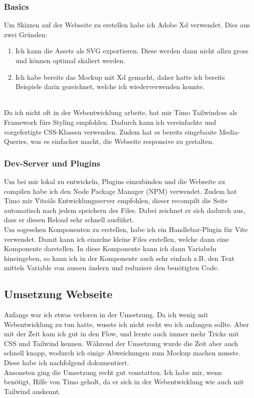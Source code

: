 \documentclass[11pt]{article}
\begin{document}
    \subsubsection{Basics}
    Um Skizzen auf der Webseite zu erstellen habe ich Adobe Xd verwendet. Dies aus zwei Gründen:
    \begin{enumerate}
        \item Ich kann die Assets als SVG exportieren. Diese werden dann nicht allzu gross und können optimal skaliert werden.
        \item Ich habe bereits das Mockup mit Xd gemacht, daher hatte ich bereits Beispiele darin gezeichnet, welche ich wiederverwenden konnte.
    \end{enumerate}
    \\
    Da ich nicht oft in der Webentwicklung arbeite, hat mir Timo Tailwindcss als Framework fürs Styling empfohlen. Dadurch kann ich vereinfachte
    und vorgefertigte CSS-Klassen verwenden. Zudem hat es bereits eingebaute Media-Queries, was es einfacher macht, die Webseite responsive
    zu gestalten.

    \subsubsection{Dev-Server und Plugins}
    Um bei mir lokal zu entwickeln, Plugins einzubinden und die Webseite zu compilen habe ich den Node Package Manager (NPM) verwendet.
    Zudem hat Timo mir \"Vite\" als Entwicklungsserver empfohlen, dieser recompilt die Seite automatisch nach jedem speichern des Files.
    Dabei zeichnet er sich dadurch aus, dass er diesen Reload sehr schnell ausführt.\\
    Um sogesehen Komponenten zu erstellen, habe ich ein Handlebar-Plugin für Vite verwendet. Damit kann ich einzelne kleine Files erstellen,
    welche dann eine Komponente darstellen. In diese Komponente kann ich dann Variabeln hineingeben, so kann ich in der Komponente auch sehr
    einfach z.B. den Text mittels Variable von aussen ändern und reduziere den benötigten Code.

    \subsection{Umsetzung Webseite}
    Anfangs war ich etwas verloren in der Umsetzung. Da ich wenig mit Webentwicklung zu tun hatte, wusste ich nicht recht wo ich anfangen sollte.
    Aber mit der Zeit kam ich gut in den Flow, und lernte auch immer mehr Tricks mit CSS und Tailwind kennen. Während der Umsetzung wurde die Zeit
    aber auch schnell knapp, wodurch ich einige Abweichungen zum Mockup machen musste. Diese habe ich nachfolgend dokumentiert.\\
    Ansonsten ging die Umsetzung recht gut vonstatten. Ich habe mir, wenn benötigt, Hilfe von Timo geholt, da er sich in der Webentwicklung wie auch
    mit Tailwind auskennt.
\end{document}
